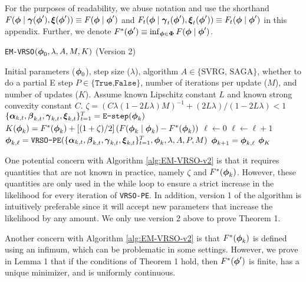 For the purposes of readability, we abuse notation and use the shorthand $F(\boldsymbol{\phi} \mid \boldsymbol{\gamma}(\boldsymbol{\phi}'), \boldsymbol{\xi}(\boldsymbol{\phi}')) \equiv F(\boldsymbol{\phi} \mid \boldsymbol{\phi}')$ and $F_{t}(\boldsymbol{\phi} \mid \boldsymbol{\gamma}_{t}(\boldsymbol{\phi}'), \boldsymbol{\xi}_{t}(\boldsymbol{\phi}')) \equiv F_{t}(\boldsymbol{\phi} \mid \boldsymbol{\phi}')$ in this appendix. Further, we denote $F^*(\boldsymbol{\phi}') \equiv \inf_{\boldsymbol{\phi} \in \boldsymbol{\Phi}} F(\boldsymbol{\phi} \mid \boldsymbol{\phi}')$.

\begin{algorithm}
\caption{\texttt{EM-VRSO}$(\boldsymbol{\phi}_0, \lambda, A, M, K)$ (Version 2)}\label{alg:EM-VRSO-v2}
\begin{algorithmic}[1]
\Require Initial parameters ($\boldsymbol{\phi}_{0}$), step size ($\lambda$), algorithm $A \in \{\text{SVRG, SAGA}\}$, whether to do a partial E step $P \in \{\texttt{True,False}\}$, number of iterations per update ($M$), and number of updates ($K$). Assume known Lipschitz constant $L$ and known strong convexity constant $C$.
%
\vspace{5pt}
%
\State $\zeta = (C \lambda(1-2L\lambda)M)^{-1} + (2L\lambda) / (1-2L\lambda) < 1$ 
%
%
% 
\State $\{\boldsymbol{\alpha}_{k,t},\boldsymbol{\beta}_{k,t},\boldsymbol{\gamma}_{k,t},\boldsymbol{\xi}_{k,t}\}_{t=1}^{T} = \texttt{E-step}(\boldsymbol{\phi}_{k})$ 
%
\State $K(\boldsymbol{\phi}_{k}) = F^{*}(\boldsymbol{\phi}_{k}) + \left[(1 + \zeta) / 2\right]\left(F(\boldsymbol{\phi}_{k} \mid \boldsymbol{\phi}_{k}) - F^{*}(\boldsymbol{\phi}_{k})\right)$
%
\State $\ell \gets 0$ 
%
\State $\ell \gets \ell+1$
\State $\boldsymbol{\phi}_{k,\ell} = \texttt{VRSO-PE}(\{\boldsymbol{\alpha}_{k,t},\boldsymbol{\beta}_{k,t},\boldsymbol{\gamma}_{k,t},\boldsymbol{\xi}_{k,t}\}_{t=1}^{T},\boldsymbol{\phi}_{k},\lambda,A,P,M)$
%
\EndWhile
\State $\boldsymbol{\phi}_{k+1} = \boldsymbol{\phi}_{k,\ell}$
\EndFor
\State \Return $\boldsymbol{\phi}_K$
\end{algorithmic}
\end{algorithm}

One potential concern with Algorithm \ref{alg:EM-VRSO-v2} is that it requires quantities that are not known in practice, namely $\zeta$ and $F^{*}(\boldsymbol{\phi}_{k})$. However, these quantities are only used in the while loop to ensure a strict increase in the likelihood for every iteration of \texttt{VRSO-PE}. In addition, version 1 of the algorithm is intuitively preferable since it will accept new parameters that increase the likelihood by any amount. We only use version 2 above to prove Theorem 1.

Another concern with Algorithm \ref{alg:EM-VRSO-v2} is that $F^{*}(\boldsymbol{\phi}_{k})$ is defined using an infimum, which can be problematic in some settings. However, we prove in Lemma 1 that if the conditions of Theorem 1 hold, then $F^*(\boldsymbol{\phi}')$ is finite, has a unique minimizer, and is uniformly continuous.

